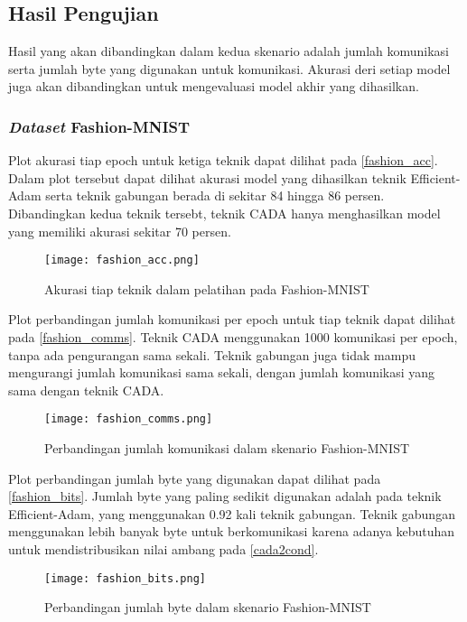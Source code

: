 \subsection{Hasil Pengujian}

Hasil yang akan dibandingkan dalam kedua skenario adalah jumlah komunikasi serta jumlah byte yang digunakan untuk komunikasi. Akurasi deri setiap model juga akan dibandingkan untuk mengevaluasi model akhir yang dihasilkan.

\subsubsection{\emph{Dataset} Fashion-MNIST}

Plot akurasi tiap epoch untuk ketiga teknik dapat dilihat pada \autoref{fashion_acc}. Dalam plot tersebut dapat dilihat akurasi model yang dihasilkan teknik Efficient-Adam serta teknik gabungan berada di sekitar 84 hingga 86 persen. Dibandingkan kedua teknik tersebt, teknik CADA hanya menghasilkan model yang memiliki akurasi sekitar 70 persen.

\begin{figure}[H]
  \centering
  \texttt{[image: fashion\_acc.png]}
  \caption{Akurasi tiap teknik dalam pelatihan pada Fashion-MNIST}\label{fashion_acc}
\end{figure}

Plot perbandingan jumlah komunikasi per epoch untuk tiap teknik dapat dilihat pada \autoref{fashion_comms}. Teknik CADA menggunakan 1000 komunikasi per epoch, tanpa ada pengurangan sama sekali. Teknik gabungan juga tidak mampu mengurangi jumlah komunikasi sama sekali, dengan jumlah komunikasi yang sama dengan teknik CADA.

\begin{figure}[H]
  \centering
  \texttt{[image: fashion\_comms.png]}
  \caption{Perbandingan jumlah komunikasi dalam skenario Fashion-MNIST}\label{fashion_comms}
\end{figure}

Plot perbandingan jumlah byte yang digunakan dapat dilihat pada \autoref{fashion_bits}. Jumlah byte yang paling sedikit digunakan adalah pada teknik Efficient-Adam, yang menggunakan 0.92 kali teknik gabungan. Teknik gabungan menggunakan lebih banyak byte untuk berkomunikasi karena adanya kebutuhan untuk mendistribusikan nilai ambang pada \autoref{cada2cond}.

\begin{figure}[H]
  \centering
  \texttt{[image: fashion\_bits.png]}
  \caption{Perbandingan jumlah byte dalam skenario Fashion-MNIST}\label{fashion_bits}
\end{figure}


